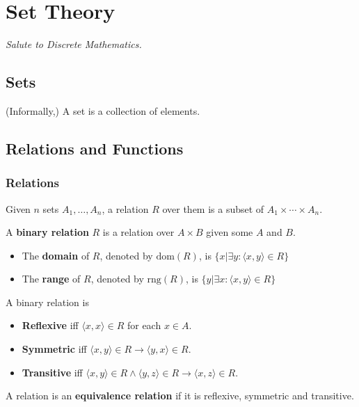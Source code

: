 \chapter{Set Theory}
\emph{Salute to Discrete Mathematics.}

\section{Sets}
\label{sec:Sets}
(Informally,) A set is a collection of elements.

\section{Relations and Functions}
\label{sec:RelationsAndFunctions}

\subsection{Relations}
\label{sub:Relation}
Given $n$ sets $A_1,\dots,A_n$, a relation $R$ over them is a subset of $A_1 \times \cdots \times A_n$.

\begin{definition}
    \label{def:BinaryRelation}
    A \textbf{binary relation} $R$ is a relation over $A \times B$ given some $A$ and $B$.
    \begin{itemize}
        \item The \textbf{domain} of $R$, denoted by $\textrm{dom}(R)$, is $\{ x | \exists y: \langle x,y \rangle \in R \}$
        \item The \textbf{range} of $R$, denoted by $\textrm{rng}(R)$, is $\{ y | \exists x: \langle x,y \rangle \in R \}$
    \end{itemize}
\end{definition}

A binary relation is
\begin{itemize}
    \item \textbf{Reflexive} iff $\langle x, x \rangle \in R$ for each $x \in A$.
    \item \textbf{Symmetric} iff $\langle x,y \rangle \in R \longrightarrow \langle y,x \rangle \in R$.
    \item \textbf{Transitive} iff $\langle x,y \rangle \in R \land \langle y,z \rangle \in R \longrightarrow \langle x,z \rangle \in R$.
\end{itemize}

A relation is an \textbf{equivalence relation} if it is reflexive, symmetric and transitive.

